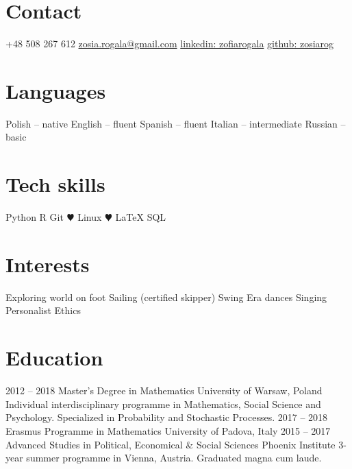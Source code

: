 \documentclass[]{appsilon} %
\begin{document}

\begin{sidebar} %
\section{Contact}
+48 508 267 612
\href{mailto:zosia.rogala@gmail.com}{zosia.rogala@gmail.com}
\href{http://linkedin.com/in/zofiarogala}{linkedin: zofiarogala}
\href{https://github.com/ZosiaRog}{github: zosiarog}
\section{Languages}
Polish -- native
English -- fluent
Spanish -- fluent
Italian -- intermediate
Russian -- basic

\section{Tech skills}
Python
R
Git
{\color{green} $\varheartsuit$} Linux
{\color{red} $\varheartsuit$} \LaTeX
SQL

\section{Interests}
Exploring world on foot
Sailing (certified skipper)
Swing Era dances
Singing
Personalist Ethics
\end{sidebar}



\section{Education}

\begin{entrylist}
	\entry
	{2012 -- 2018}
	{Master's Degree in Mathematics}
	{University of Warsaw, Poland}
	{Individual interdisciplinary programme in Mathematics, Social Science and Psychology. Specialized in Probability and Stochastic Processes.}
	\entry
	{2017 -- 2018}
	{Erasmus Programme in Mathematics}
	{University of Padova, Italy}
	{\vspace{-0.4cm}}
	\entry
	{2015 -- 2017}
	{Advanced Studies in Political, Economical \& Social Sciences}
	{Phoenix Institute}
	{3-year summer programme in Vienna, Austria. Graduated magna cum laude.}
\end{entrylist}
\end{document}
